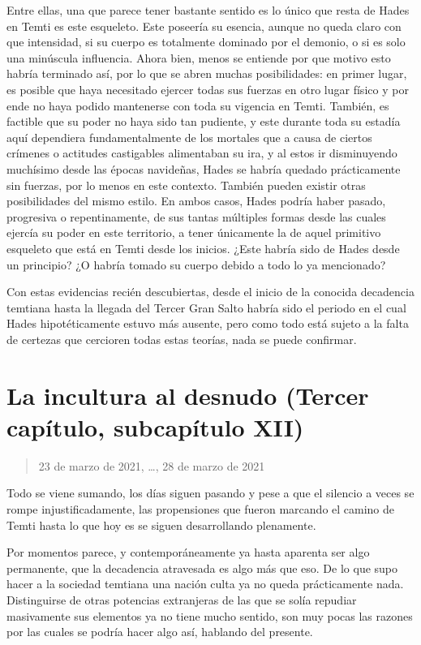 \documentclass[
  spanish,
]{book}
\begin{document}
Entre ellas, una que parece tener bastante sentido es lo único que resta de Hades en Temti es este esqueleto. Este poseería su esencia, aunque no queda claro con que intensidad, si su cuerpo es totalmente dominado por el demonio, o si es solo una minúscula influencia. Ahora bien, menos se entiende por que motivo esto habría terminado así, por lo que se abren muchas posibilidades: en primer lugar, es posible que haya necesitado ejercer todas sus fuerzas en otro lugar físico y por ende no haya podido mantenerse con toda su vigencia en Temti. También, es factible que su poder no haya sido tan pudiente, y este durante toda su estadía aquí dependiera fundamentalmente de los mortales que a causa de ciertos crímenes o actitudes castigables alimentaban su ira, y al estos ir disminuyendo muchísimo desde las épocas navideñas, Hades se habría quedado prácticamente sin fuerzas, por lo menos en este contexto. También pueden existir otras posibilidades del mismo estilo. En ambos casos, Hades podría haber pasado, progresiva o repentinamente, de sus tantas múltiples formas desde las cuales ejercía su poder en este territorio, a tener únicamente la de aquel primitivo esqueleto que está en Temti desde los inicios. ¿Este habría sido de Hades desde un principio? ¿O habría tomado su cuerpo debido a todo lo ya mencionado?

Con estas evidencias recién descubiertas, desde el inicio de la conocida decadencia temtiana hasta la llegada del Tercer Gran Salto habría sido el periodo en el cual Hades hipotéticamente estuvo más ausente, pero como todo está sujeto a la falta de certezas que cercioren todas estas teorías, nada se puede confirmar.

\hypertarget{la-incultura-al-desnudo-tercer-capuxedtulo-subcapuxedtulo-xii}{%
\section{La incultura al desnudo (Tercer capítulo, subcapítulo XII)}\label{la-incultura-al-desnudo-tercer-capuxedtulo-subcapuxedtulo-xii}}

\begin{quote}
23 de marzo de 2021, \ldots, 28 de marzo de 2021
\end{quote}

Todo se viene sumando, los días siguen pasando y pese a que el silencio a veces se rompe injustificadamente, las propensiones que fueron marcando el camino de Temti hasta lo que hoy es se siguen desarrollando plenamente.

Por momentos parece, y contemporáneamente ya hasta aparenta ser algo permanente, que la decadencia atravesada es algo más que eso.
De lo que supo hacer a la sociedad temtiana una nación culta ya no queda prácticamente nada. Distinguirse de otras potencias extranjeras de las que se solía repudiar masivamente sus elementos ya no tiene mucho sentido, son muy pocas las razones por las cuales se podría hacer algo así, hablando del presente.
\end{document}
